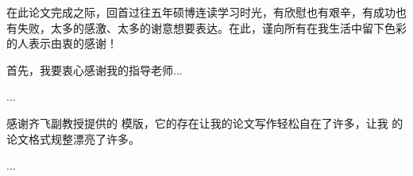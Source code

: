 
\begin{acknowledgments}

在此论文完成之际，回首过往五年硕博连读学习时光，有欣慰也有艰辛，有成功也有失败，太多的感激、太多的谢意想要表达。在此，谨向所有在我生活中留下色彩的人表示由衷的感谢！

首先，我要衷心感谢我的指导老师...

...

感谢齐飞副教授提供的 \xduthesis{} 模版，它的存在让我的论文写作轻松自在了许多，让我
的论文格式规整漂亮了许多。


...

\end{acknowledgments}


